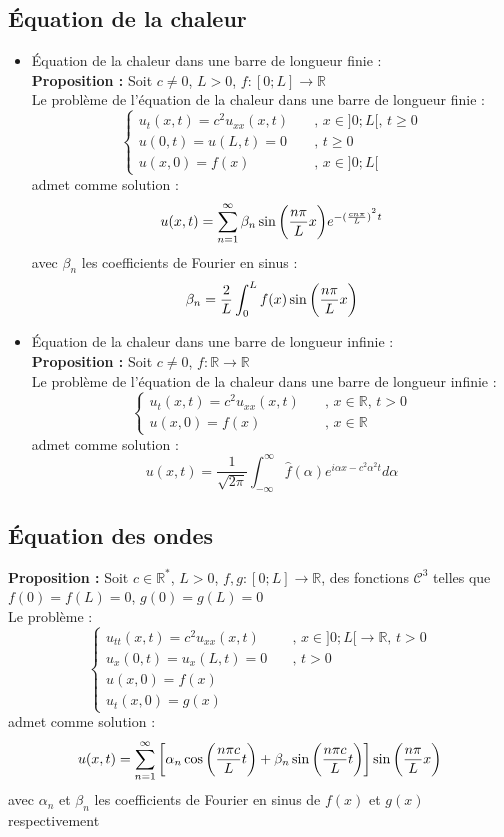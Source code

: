 \subsection{Équation de la chaleur}
\begin{itemize}
    \item Équation de la chaleur dans une barre de longueur finie : \\
    \textbf{Proposition :} Soit $c \neq 0$, $L > 0$, $f : [0;L] \to \mathbb{R}$ \\
    Le problème de l'équation de la chaleur dans une barre de longueur finie :
    $$
    \begin{cases}
        u_t(x,t) = c^2u_{xx}(x,t) \quad &\text{, }x \in ]0;L[\text{, }t \geq 0 \\
        u(0,t) = u(L,t) = 0 \quad &\text{, }t \geq 0 \\
        u(x,0) = f(x) \quad &\text{, }x \in ]0;L[
    \end{cases}
    $$
    admet comme solution :
    $$u(x,t) = \sum_{n=1}^{\infty}\beta_n \sin \bigg{(} \frac{n\pi}{L}x \bigg{)} e^{-(\frac{cn\pi}{L})^{^2} t}$$
    avec $\beta_n$ les coefficients de Fourier en sinus :
    $$\beta_n = \frac{2}{L} \int_0^Lf(x) \sin \bigg{(} \frac{n\pi}{L}x \bigg{)}$$
    \item Équation de la chaleur dans une barre de longueur infinie : \\
    \textbf{Proposition :} Soit $c \neq 0$, $f : \mathbb{R} \to \mathbb{R}$ \\
    Le problème de l'équation de la chaleur dans une barre de longueur infinie :
    $$
    \begin{cases}
        u_t(x,t) = c^2u_{xx}(x,t) \quad &\text{, }x \in \mathbb{R} \text{, }t > 0 \\
        u(x,0) = f(x) \quad &\text{, }x \in \mathbb{R}
    \end{cases}
    $$
    admet comme solution :
    $$u(x,t) = \frac{1}{\sqrt{2\pi}} \int_{-\infty}^{\infty} \widehat{f}(\alpha) e^{i\alpha x - c^2\alpha^2t} d\alpha$$
\end{itemize}

\subsection{Équation des ondes}
\textbf{Proposition :} Soit $c \in \mathbb{R}^*$, $L > 0$, $f,g : [0;L] \to \mathbb{R}$, des fonctions $\mathcal{C}^3$ telles que $f(0) = f(L) = 0$, $g(0) = g(L) = 0$\\
Le problème :
$$
\begin{cases}
    u_{tt}(x,t) = c^2u_{xx}(x,t) \quad &\text{, } x \in ]0;L[ \to \mathbb{R} \text{, } t > 0 \\
    u_x(0,t) = u_x(L,t) = 0 \quad &\text{, } t > 0 \\
    u(x,0) = f(x) \\
    u_t(x,0) = g(x)
\end{cases}
$$
admet comme solution :
$$u(x,t) = \sum_{n=1}^{\infty} \bigg{[} \alpha_n \cos \bigg{(} \frac{n\pi c}{L}t \bigg{)} + \beta_n \sin \bigg{(} \frac{n\pi c}{L}t \bigg{)} \bigg{]} \sin \bigg{(} \frac{n\pi}{L}x \bigg{)}$$
avec $\alpha_n$ et $\beta_n$ les coefficients de Fourier en sinus de $f(x)$ et $g(x)$ respectivement